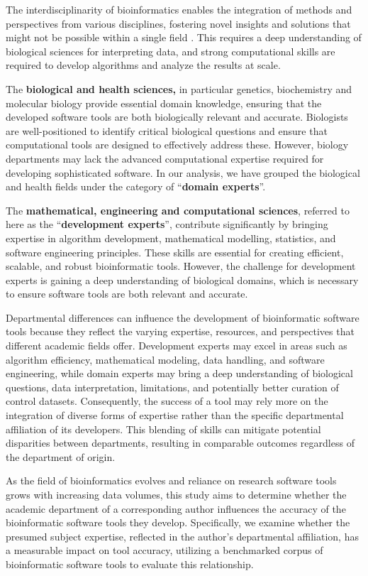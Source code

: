 \documentclass[fleqn,10pt,doc,onecolumn]{SelfArx}%
\begin{document}
The interdisciplinarity of bioinformatics enables the integration of
methods and perspectives from various disciplines, fostering novel
insights and solutions that might not be possible within a single
field \cite{mazzocchi2019scientific}. This requires a deep
understanding of biological sciences for interpreting
data, and strong computational skills are required to develop
algorithms and analyze the results at scale.

The \textbf{biological and health sciences,} in particular genetics,
biochemistry and molecular biology provide essential domain knowledge,
ensuring that the developed software tools are both biologically relevant
and accurate.  Biologists are well-positioned to identify critical biological
questions and ensure that computational tools are designed to
effectively address these. However, biology departments may
lack the advanced computational expertise required for developing sophisticated
software. In our analysis, we have grouped the biological and health fields
under the category of ``\textbf{domain experts}''.

The \textbf{mathematical, engineering and computational sciences},
referred to here as the ``\textbf{development experts}'', contribute
significantly by bringing expertise in algorithm development,
mathematical modelling, statistics, and software engineering
principles. These skills are essential for creating efficient,
scalable, and robust bioinformatic tools.  However, the challenge for
development experts is gaining a deep understanding of biological domains,
which is necessary to ensure software tools are both relevant
and accurate.

Departmental differences can influence the development of
bioinformatic software tools because they reflect the varying
expertise, resources, and perspectives that different academic fields
offer. Development experts may excel in areas such as algorithm
efficiency, mathematical modeling, data handling, and software
engineering, while domain experts may bring a deep understanding of
biological questions, data interpretation, limitations, and
potentially better curation of control datasets. Consequently, the
success of a tool may rely more on the integration of diverse
forms of expertise rather than the specific departmental affiliation
of its developers. This blending of skills can mitigate potential
disparities between departments, resulting in comparable outcomes
regardless of the department of origin.

As the field of bioinformatics evolves and reliance on research
software tools grows with increasing data volumes, this study aims to
determine whether the academic department of a corresponding author
influences the accuracy of the bioinformatic software tools they
develop. Specifically, we examine whether the presumed subject
expertise, reflected in the author's departmental affiliation, has a
measurable impact on tool accuracy, utilizing a benchmarked corpus of
bioinformatic software tools to evaluate this relationship.
\end{document}
